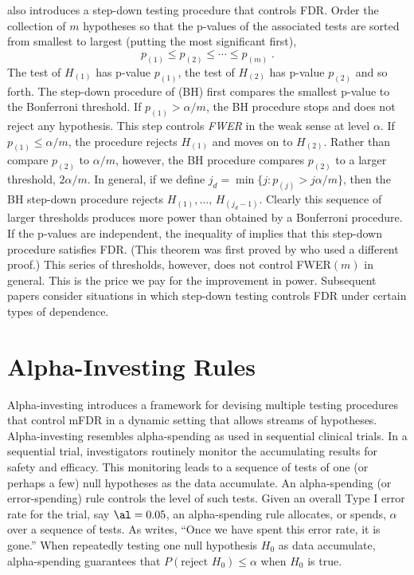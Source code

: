 \documentclass[12pt]{article}
\begin{document}
\citet{benjamini95} also introduces a step-down testing procedure that
 controls FDR. Order the collection of $m$ hypotheses so that
 the p-values of the associated tests are sorted from
 smallest to largest (putting the most significant first),
\begin{equation}
  p_{(1)} \le p_{(2)} \le \cdots \le p_{(m)} \;.
\label{eq:ordered:pv}
\end{equation}
The test of $H_{(1)}$ has p-value $p_{(1)}$, the test of $H_{(2)}$ has
p-value $p_{(2)}$ and so forth.  The step-down procedure of
\citet{benjamini95} (BH) first compares the smallest p-value to the
Bonferroni threshold.  If $p_{(1)} > \alpha/m$, the BH procedure stops
and does not reject any hypothesis.  This step controls {\em FWER} in
the weak sense at level $\alpha$.  If $p_{(1)} \le \alpha/m$, the
procedure rejects $H_{(1)}$ and moves on to $H_{(2)}$.  Rather
than compare $p_{(2)}$ to $\alpha/m$, however, the BH procedure
compares $p_{(2)}$ to a larger threshold, $2 \alpha/m$.  In general,
if we define $j_d = \min\{j:p_{(j)} > j\alpha / m\}$, then the BH
step-down procedure rejects $H_{(1)}, \ldots, \, H_{(j_d - 1)}$.
Clearly this sequence of larger thresholds produces more power than obtained by a Bonferroni procedure.  If
the p-values are independent, the inequality of \citet{simes86}
implies that this step-down procedure satisfies FDR. (This theorem was
first proved by \citet{benjamini95} who used a different proof.) This series of
thresholds, however, does not control FWER$(m)$ in general.  This is
the price we pay for the improvement in power.  Subsequent papers
\citep[such as][]{benjamini01, sarkar98, troendle96} consider
situations in which step-down testing controls FDR under certain types
of dependence.

\section{Alpha-Investing Rules}   \label{sec:alpha:investing}         %

Alpha-investing introduces a framework for devising multiple
 testing procedures that control mFDR in a dynamic setting that allows
 streams of hypotheses.  Alpha-investing resembles alpha-spending
 as used in sequential clinical trials.  In a
 sequential trial, investigators routinely monitor the accumulating
 results for safety and efficacy.  This monitoring leads to a sequence
 of tests of one (or perhaps a few) null hypotheses as the data
 accumulate.  An alpha-spending (or error-spending) rule controls the
 level of such tests.  Given an overall Type I error rate for the
 trial, say $\al = 0.05$, an alpha-spending rule allocates, or spends,
 $\alpha$ over a sequence of tests.  As \citet{tukey91} writes, ``Once
 we have spent this error rate, it is gone.''  When repeatedly testing
 one null hypothesis $H_0$ as data accumulate, alpha-spending
 guarantees that $P(\mbox{reject } H_0) \le \alpha$ when $H_0$ is true.
\end{document}
